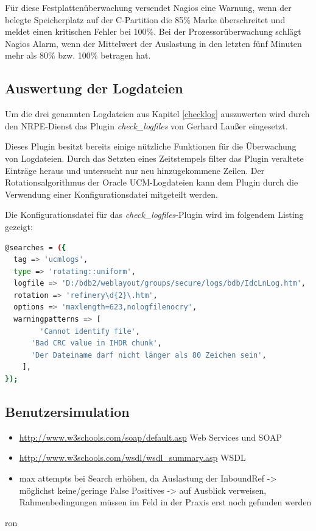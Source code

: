 Für diese Festplattenüberwachung versendet Nagios eine Warnung, wenn der belegte Speicherplatz auf der C-Partition die 85\% Marke überschreitet und meldet einen kritischen Fehler bei 100\%.
Bei der Prozessorüberwachung schlägt Nagios Alarm, wenn der Mittelwert der Auslastung in den letzten fünf Minuten mehr als 80\% bzw. 100\%  betragen hat.




\subsection{Auswertung der Logdateien}

Um die drei genannten Logdateien aus Kapitel \ref{checklog} auszuwerten wird durch den \gls{NRPE}-Dienst das Plugin \textit{check\_logfiles} von Gerhard Laußer eingesetzt.

Dieses Plugin besitzt bereits einige nützliche Funktionen für die Überwachung von Logdateien.
Durch das Setzten eines Zeitstempels filter das Plugin veraltete Einträge heraus und untersucht nur neu hinzugekommene Zeilen.
Der Rotationsalgorithmus der Oracle UCM-Logdateien kann dem Plugin durch die Verwendung einer Konfigurationsdatei mitgeteilt werden.

Die Konfigurationsdatei für das \textit{check\_logfiles}-Plugin wird im folgendem Listing gezeigt:


\begin{lstlisting}[captionpos=b, caption=Konfigurationsdatei für \textit{check\_logfiles}, label=chklogcfg, breaklines = true, language=sh]
@searches = ({
  tag => 'ucmlogs',
  type => 'rotating::uniform',
  logfile => 'D:/bdb2/weblayout/groups/secure/logs/bdb/IdcLnLog.htm',
  rotation => 'refinery\d{2}\.htm',
  options => 'maxlength=623,nologfilenocry',
  warningpatterns => [
        'Cannot identify file',
	  'Bad CRC value in IHDR chunk',
	  'Der Dateiname darf nicht länger als 80 Zeichen sein',
    ],
});
\end{lstlisting}


\subsection{Benutzersimulation}





\begin{itemize}
\item \url{http://www.w3schools.com/soap/default.asp} Web Services und SOAP
\item \url{http://www.w3schools.com/wsdl/wsdl_summary.asp} WSDL
\item max attempts bei Search erhöhen, da Auslastung der InboundRef -> möglichst keine/geringe False Positives -> auf Ausblick verweisen, Rahmenbedingungen müssen im Feld in der Praxis erst noch gefunden werden
\end{itemize}ron

